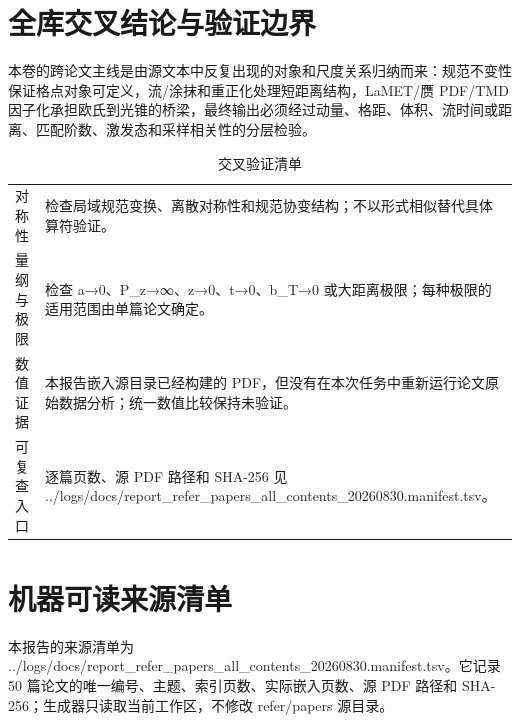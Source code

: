 \documentclass[UTF8,11pt,oneside]{ctexbook}
\begin{document}
\backmatter
\chapter*{全库交叉结论与验证边界}
本卷的跨论文主线是由源文本中反复出现的对象和尺度关系归纳而来：规范不变性保证格点对象可定义，流/涂抹和重正化处理短距离结构，LaMET/赝 PDF/TMD 因子化承担欧氏到光锥的桥梁，最终输出必须经过动量、格距、体积、流时间或距离、匹配阶数、激发态和采样相关性的分层检验。
\begin{table}[htbp]
  \centering
  \caption{交叉验证清单}
  \small
  \begin{tabularx}{0.96\textwidth}{@{}p{3.3cm}>{\raggedright\arraybackslash}X@{}}
    \toprule
    对称性 & 检查局域规范变换、离散对称性和规范协变结构；不以形式相似替代具体算符验证。 \\
    量纲与极限 & 检查 a→0、P\_z→∞、z→0、t→0、b\_T→0 或大距离极限；每种极限的适用范围由单篇论文确定。 \\
    数值证据 & 本报告嵌入源目录已经构建的 PDF，但没有在本次任务中重新运行论文原始数据分析；统一数值比较保持未验证。 \\
    可复查入口 & 逐篇页数、源 PDF 路径和 SHA-256 见 ../\allowbreak{}logs/\allowbreak{}docs/\allowbreak{}report\_\allowbreak{}refer\_\allowbreak{}papers\_\allowbreak{}all\_\allowbreak{}contents\_\allowbreak{}20260830.manifest.tsv。 \\
    \bottomrule
  \end{tabularx}
\end{table}
\chapter*{机器可读来源清单}
本报告的来源清单为 ../\allowbreak{}logs/\allowbreak{}docs/\allowbreak{}report\_\allowbreak{}refer\_\allowbreak{}papers\_\allowbreak{}all\_\allowbreak{}contents\_\allowbreak{}20260830.manifest.tsv。它记录 50 篇论文的唯一编号、主题、索引页数、实际嵌入页数、源 PDF 路径和 SHA-256；生成器只读取当前工作区，不修改 refer/papers 源目录。
\end{document}
